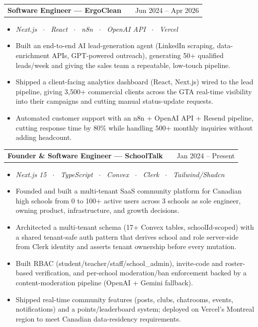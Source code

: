 \documentclass[a4paper,10.5pt]{article}
\makeatletter
\newenvironment{joblong}[2]
    {
    \begin{tabularx}{\linewidth}{@{}l X r@{}}
    \textbf{#1} & \hfill & #2 \\[1.5pt]
    \end{tabularx}
    \begin{minipage}[t]{\linewidth}
    \begin{itemize}[nosep,after=\strut, leftmargin=1em, itemsep=0.5pt,label=--]
    }
    {
    \end{itemize}
    \end{minipage}
    }
\makeatother
\begin{document}
\begin{joblong}{Software Engineer --- ErgoClean}{Jun 2024 -- Apr 2026}
    \item[] \textit{\small Next.js \ $\cdot$ \ React \ $\cdot$ \ n8n \ $\cdot$ \ OpenAI API \ $\cdot$ \ Vercel} \\[-8pt]
    \item Built an end-to-end AI lead-generation agent (LinkedIn scraping, data-enrichment APIs, GPT-powered outreach), generating 50+ qualified leads/week and giving the sales team a repeatable, low-touch pipeline.
    \item Shipped a client-facing analytics dashboard (React, Next.js) wired to the lead pipeline, giving 3,500+ commercial clients across the GTA real-time visibility into their campaigns and cutting manual status-update requests.
    \item Automated customer support with an n8n + OpenAI API + Resend pipeline, cutting response time by 80\% while handling 500+ monthly inquiries without adding headcount.
\end{joblong}

\begin{joblong}{Founder \& Software Engineer --- SchoolTalk}{Jan 2024 -- Present}
    \item[] \textit{\small Next.js 15 \ $\cdot$ \ TypeScript \ $\cdot$ \ Convex \ $\cdot$ \ Clerk \ $\cdot$ \ Tailwind/Shadcn} \\[-8pt]
    \item Founded and built a multi-tenant SaaS community platform for Canadian high schools from 0 to 100+ active users across 3 schools as sole engineer, owning product, infrastructure, and growth decisions.
    \item Architected a multi-tenant schema (17+ Convex tables, schoolId-scoped) with a shared tenant-safe auth pattern that derives school and role server-side from Clerk identity and asserts tenant ownership before every mutation.
    \item Built RBAC (student/teacher/staff/school\_admin), invite-code and roster-based verification, and per-school moderation/ban enforcement backed by a content-moderation pipeline (OpenAI + Gemini fallback).
    \item Shipped real-time community features (posts, clubs, chatrooms, events, notifications) and a points/leaderboard system; deployed on Vercel's Montreal region to meet Canadian data-residency requirements.
\end{joblong}
\end{document}
